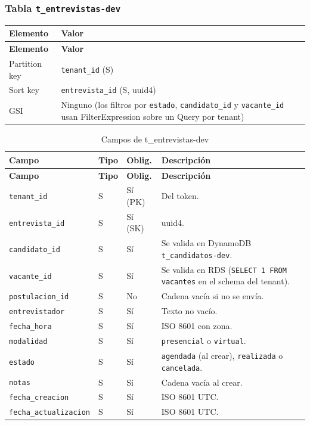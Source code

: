 \subsubsection{Tabla \texttt{t\_entrevistas-dev}}
\begin{longtable}{p{3.5cm}p{10.5cm}}
\toprule
\textbf{Elemento} & \textbf{Valor} \\
\midrule
\endfirsthead
\toprule
\textbf{Elemento} & \textbf{Valor} \\
\midrule
\endhead
\bottomrule
\endlastfoot
Partition key & \texttt{tenant\_\allowbreak{}id} (S) \\
Sort key & \texttt{entrevista\_\allowbreak{}id} (S, uuid4) \\
GSI & Ninguno (los filtros por \texttt{estado}, \texttt{candidato\_\allowbreak{}id} y \texttt{vacante\_\allowbreak{}id} usan FilterExpression sobre un Query por tenant) \\
\end{longtable}

\begin{longtable}{p{3.4cm}p{1.2cm}p{1.4cm}p{8cm}}
\caption{Campos de t\_entrevistas-dev}\\
\toprule
\textbf{Campo} & \textbf{Tipo} & \textbf{Oblig.} & \textbf{Descripción} \\
\midrule
\endfirsthead
\toprule
\textbf{Campo} & \textbf{Tipo} & \textbf{Oblig.} & \textbf{Descripción} \\
\midrule
\endhead
\bottomrule
\endlastfoot
\texttt{tenant\_\allowbreak{}id} & S & Sí (PK) & Del token. \\
\texttt{entrevista\_\allowbreak{}id} & S & Sí (SK) & uuid4. \\
\texttt{candidato\_\allowbreak{}id} & S & Sí & Se valida en DynamoDB \texttt{t\_\allowbreak{}candidatos-\allowbreak{}dev}. \\
\texttt{vacante\_\allowbreak{}id} & S & Sí & Se valida en RDS (\texttt{SELECT 1 FROM vacantes} en el schema del tenant). \\
\texttt{postulacion\_\allowbreak{}id} & S & No & Cadena vacía si no se envía. \\
\texttt{entrevistador} & S & Sí & Texto no vacío. \\
\texttt{fecha\_\allowbreak{}hora} & S & Sí & ISO 8601 con zona. \\
\texttt{modalidad} & S & Sí & \texttt{presencial} o \texttt{virtual}. \\
\texttt{estado} & S & Sí & \texttt{agendada} (al crear), \texttt{realizada} o \texttt{cancelada}. \\
\texttt{notas} & S & Sí & Cadena vacía al crear. \\
\texttt{fecha\_\allowbreak{}creacion} & S & Sí & ISO 8601 UTC. \\
\texttt{fecha\_\allowbreak{}actualizacion} & S & Sí & ISO 8601 UTC. \\
\end{longtable}

